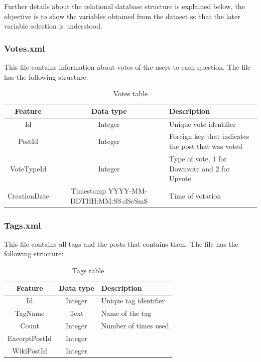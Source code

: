 \documentclass[11pt]{article} %
\begin{document}
    Further details about the relational database structure is explained below, the objective is to show the variables obtained from the dataset so that the later variable selection is understood.

    \subsubsection{Votes.xml}

      This file contains information about votes of the users to each question. The file has the following structure:

      \begin{table}[!ht]
        \centering
        \begin{tabular}{|c|c|p{}|}
          \hline
          Feature & Data type & Description \\ \hline
          Id & Integer & Unique vote identifier \\ \hline
          PostId & Integer & Foreign key that indicates the post that was voted \\ \hline
          VoteTypeId & Integer & Type of vote, 1 for Downvote and 2 for Upvote \\ \hline
          CreationDate & Timestamp YYYY-MM-DDTHH:MM:SS.dScSmS & Time of votation \\ \hline
        \end{tabular}
        \caption{Votes table}
        \label{tab:votes}
      \end{table}

\newpage

    \subsubsection{Tags.xml}

      This file contains all tags and the posts that contains them. The file has the following structure:

      \begin{table}[!ht]
        \centering
        \begin{tabular}{|c|c|p{}|}
          \hline

          Feature & Data type & Description \\ \hline
          Id & Integer & Unique tag identifier \\ \hline
          TagName & Text & Name of the tag \\ \hline
          Count & Integer & Number of times used \\ \hline
          ExcerptPostId & Integer & \\ \hline
          WikiPostId & Integer & \\

          \hline
        \end{tabular}
        \caption{Tags table}
        \label{tab:tags}
      \end{table}
\end{document}
